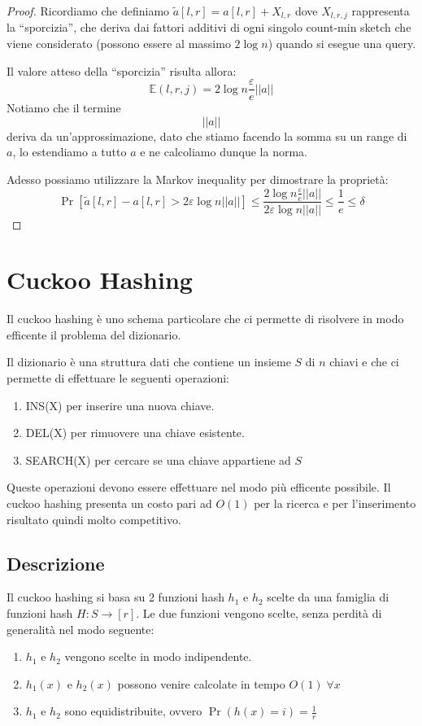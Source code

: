 \documentclass[a4paper,11pt]{book}
\begin{document}
\begin{proof}
Ricordiamo che definiamo $\tilde{a}[l,r] = a[l,r] + X_{l,r}$ dove $X_{l,r,j}$ rappresenta la ``sporcizia'', che deriva dai fattori additivi di ogni singolo count-min sketch che viene considerato (possono essere al massimo $2\log n$) quando si esegue una query.

Il valore atteso della ``sporcizia'' risulta allora: $$\mathbb{E}(l,r,j) = 2 \log n \frac{\varepsilon}{e} ||a||$$ Notiamo che il termine $$||a||$$ deriva da un'approssimazione, dato che stiamo facendo la somma su un range di $a$, lo estendiamo a tutto $a$ e ne calcoliamo dunque la norma.

Adesso possiamo utilizzare la Markov inequality per dimostrare la propriet\`a: $$\Pr[\tilde{a}[l,r] - a[l,r] > 2 \varepsilon \log n ||a|| ] \leq \frac{2 \log n \frac{\varepsilon}{e} ||a||}{2 \varepsilon \log n||a||} \leq \frac{1}{e} \leq \delta $$

\end{proof}

\chapter{Cuckoo Hashing}

Il cuckoo hashing \`e uno schema particolare che ci permette di risolvere in modo efficente il problema del dizionario.

Il dizionario \`e una struttura dati che contiene un insieme $S$ di $n$ chiavi e che ci permette di effettuare le seguenti operazioni:
\begin{enumerate}
\item \textsf{INS(X)} per inserire una nuova chiave.
\item \textsf{DEL(X)} per rimuovere una chiave esistente.
\item \textsf{SEARCH(X)} per cercare se una chiave appartiene ad $S$
\end{enumerate}
Queste operazioni devono essere effettuare nel modo pi\`u efficente possibile. Il cuckoo hashing presenta un costo pari ad $O(1)$ per la ricerca e per l'inserimento risultato quindi molto competitivo.

\section{Descrizione}

Il cuckoo hashing si basa su 2 funzioni hash $h_1$ e $h_2$ scelte da una famiglia di funzioni hash $H:S \rightarrow [r]$. Le due funzioni vengono scelte, senza perdit\`a di generalit\`a nel modo seguente:
\begin{enumerate}
\item $h_1$ e $h_2$ vengono scelte in modo indipendente.
\item $h_1(x)$ e $h_2(x)$ possono venire calcolate in tempo $O(1) \; \forall x$
\item $h_1$ e $h_2$ sono equidistribuite, ovvero $\Pr(h(x)=i) = \frac{1}{r}$
\end{enumerate}
\end{document}
